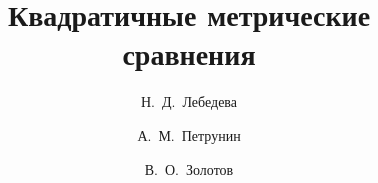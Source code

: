 \documentclass{article}
\def\thetitle{Квадратичные метрические сравнения}
\begin{document}
\title{\thetitle}
\author[Nina Lebedeva]{Н.~Д.~Лебедева}
\address{Санкт-Петербургский государственный университет;\\
С.-Петербургское отделение Математического института им. В. А. Стеклова РАН, Санкт-Петербург, Россия}
\author[Anton Petrunin]{А.~М.~Петрунин}
\address{Math. Dept. PSU, University Park, PA 16802, USA.}
\author[Vladimir Zolotov]{В.~О.~Золотов}
\address{Санкт-Петербургский государственный университет, Санкт-Петербург, Россия}
\maketitle


\end{document}
